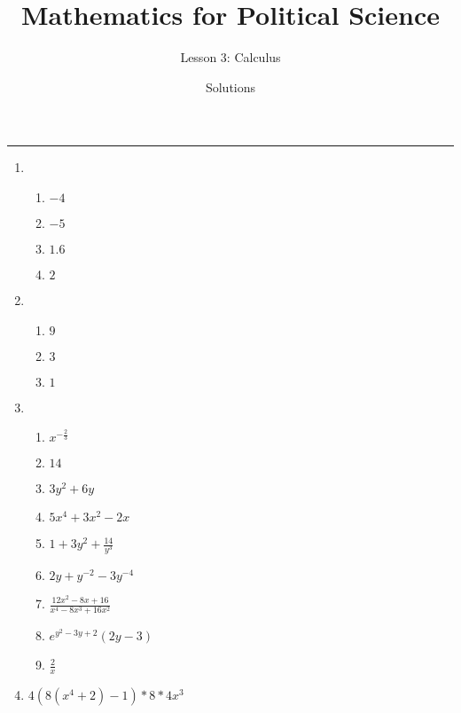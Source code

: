 \documentclass[11pt]{article}
\begin{document}
\title{\Large{\bf{\vspace{-100pt}Mathematics for Political Science \vspace{-15pt}}}}
\author{\large{Lesson 3: Calculus}}
\date{\vspace{-5pt}\large{Solutions \vspace{-10pt}}}

\maketitle

\hrule



\begin{enumerate}



\item  
\begin{enumerate}
\item $-4$
\item $-5$
\item $1.6$
\item $2$
\end{enumerate}



\item 
\begin{enumerate}
\item $9$
\item $3$
\item $1$
\end{enumerate}



\item 
  \begin{enumerate}
   \item $x^{-\frac{2}{3}}$ 
   \item $14$ 
   \item $3y^2 + 6y$ 
   \item $5x^4 + 3x^2 - 2x$ 
   \item $1 + 3y^2 + \frac{14}{y^3}$ 
   \item $2y + y^{-2} - 3y^{-4}$ 
   \item $\frac{12x^2 - 8x + 16}{x^4 - 8x^3 + 16x^2}$ 
   \item $e^{y^2 - 3y + 2} (2y-3)$ 
   \item $\frac{2}{x}$
  \end{enumerate}



\item  $4(8(x^4+2)-1)*8*4x^3$







\end{enumerate}
\end{document}
